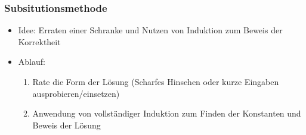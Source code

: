 \documentclass[
    ngerman,
    color=3b,
    dark_mode,
    load_common, %
    summary,
    boxarc,
]{rubos-tuda-template}
\begin{document}
\subsubsection{Subsitutionsmethode}\mbox{}
\begin{itemize}
    \item Idee: Erraten einer Schranke und Nutzen von Induktion zum Beweis der Korrektheit
    \item Ablauf:
          \begin{enumerate}
              \item Rate die Form der Lösung (Scharfes Hinsehen oder kurze Eingaben ausprobieren/einsetzen)
              \item Anwendung von vollständiger Induktion zum Finden der Konstanten und Beweis der Lösung
          \end{enumerate}
\end{itemize}
\clearpage
\end{document}
